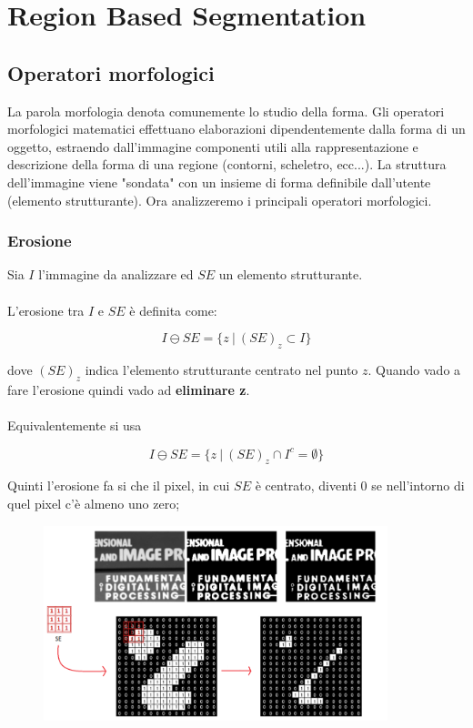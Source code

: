 \section{Region Based Segmentation}
\subsection{Operatori morfologici}

La parola morfologia denota comunemente lo studio della forma.
Gli operatori morfologici matematici effettuano elaborazioni dipendentemente dalla forma di un oggetto, estraendo
dall'immagine componenti utili alla rappresentazione e descrizione della forma di una regione (contorni, scheletro, ecc...).
La struttura dell'immagine viene "sondata" con un insieme di forma definibile dall'utente (elemento strutturante).
Ora analizzeremo i principali operatori morfologici.

\subsubsection{Erosione}

Sia $I$ l'immagine da analizzare ed $SE$ un elemento strutturante.
\\\\
L'erosione tra $I$ e $SE$ è definita come:

\begin{equation}\label{eq:erosione}
    I \ominus SE = \{z \ | \ (SE)_z \subset I\}
\end{equation}

dove $(SE)_z$ indica l'elemento strutturante centrato nel punto $z$.
Quando vado a fare l'erosione quindi vado ad \textbf{eliminare z}.
\\\\
Equivalentemente si usa

$$
    I \ominus SE = \{z \ | \ (SE)_z \cap I^c = \emptyset\}
$$

Quinti l'erosione fa si che il pixel, in cui $SE$ è centrato, diventi 0 se nell'intorno di quel pixel c'è almeno uno zero;

\begin{figure}[H]
    \centering
    \includegraphics[width=10cm, keepaspectratio]{capitoli/immagini/imgs/erosione-esempio.png}
\end{figure}

